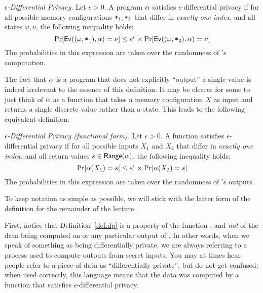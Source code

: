 \documentclass[11pt,twoside]{scrartcl}
\begin{document}
\begin{definition}{\emph{$\epsilon$-Differential Privacy.}}
\label{def:dp1}
Let $\epsilon > 0$. A program $\alpha$ satisfies $\epsilon$-differential privacy if for all possible memory configurations $\texttt{\upshape *}_1, \texttt{\upshape *}_2$ that differ in \emph{exactly one index}, and all states $\omega,\nu$, the following inequality holds:
\begin{equation}
\mathrm{Pr}[\mathsf{Ev}((\omega,\texttt{\upshape *}_1),\alpha) = \nu] \le e^\epsilon \times \mathrm{Pr}[\mathsf{Ev}((\omega,\texttt{\upshape *}_2),\alpha) = \nu]
\end{equation}
The probabilities in this expression are taken over the randomness of \san's computation.
\end{definition}
The fact that $\alpha$ is a program that does not explicitly ``output'' a single value is indeed irrelevant to the essence of this definition. It may be clearer for some to just think of $\alpha$ as a function that takes a memory configuration $X$ as input and returns a single discrete value rather than a state. This leads to the following equivalent definition.
\begin{definition}{\emph{$\epsilon$-Differential Privacy (functional form).}}
\label{def:dp}
Let $\epsilon > 0$. A function \san satisfies $\epsilon$-differential privacy if for all possible inputs $X_1$ and $X_2$ that differ in \emph{exactly one index}, and all return values $s \in \mathsf{Range}(\alpha)$, the following inequality holds:
\begin{equation}
\label{eq:ep0-1}
\mathrm{Pr}[\san(X_1) = s] \le e^\epsilon \times \mathrm{Pr}[\san(X_2) = s]
\end{equation}
The probabilities in this expression are taken over the randomness of \san's outputs.
\end{definition}
To keep notation as simple as possible, we will stick with the latter form of the definition for the remainder of the lecture.

First, notice that Definition~\ref{def:dp} is a property of the function \san, and \emph{not} of the data being computed on or any particular output of \san. In other words, when we speak of something as being differentially private, we are always referring to a process used to compute outputs from secret inputs. You may at times hear people refer to a piece of data as ``differentially private'', but do not get confused; when used correctly, this language means that the data was computed by a function that satisfies $\epsilon$-differential privacy.
\end{document}
